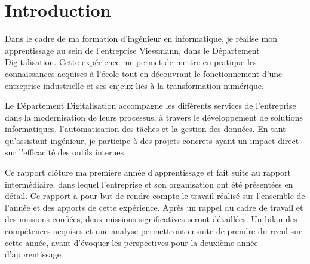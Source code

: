 \documentclass[pe1a]{tnreport} %
\begin{document}
\maketitle
{}


\cleardoublepage

\makesecondtitle

\cleardoublepage

\renewcommand{\baselinestretch}{0.5}\normalsize
\tableofcontents
\renewcommand{\baselinestretch}{1.0}\normalsize
\cleardoublepage

\setcounter{page}{1}

\chapter{Introduction}

Dans le cadre de ma formation d'ingénieur en informatique, je réalise mon apprentissage au sein de l'entreprise Viessmann, 
dans le Département Digitalisation. Cette expérience me permet de mettre en pratique les connaissances 
acquises à l'école tout en découvrant le fonctionnement d'une entreprise industrielle 
et ses enjeux liés à la transformation numérique.

Le Département Digitalisation accompagne les différents services de l'entreprise dans 
la modernisation de leurs processus, à travers le développement de solutions 
informatiques, l'automatisation des tâches et la gestion des données. En tant 
qu'assistant ingénieur, je participe à des projets concrets ayant un impact direct 
sur l'efficacité des outils internes.

Ce rapport clôture ma première année d'apprentissage et fait suite au rapport 
intermédiaire, dans lequel l'entreprise et son organisation ont été présentées en 
détail. Ce rapport a pour but de rendre compte le travail réalisé sur l'ensemble de 
l'année et des apports de cette expérience. Après un rappel du cadre de travail 
et des missions confiées, deux missions significatives seront détaillées. 
Un bilan des compétences acquises et une analyse permettront ensuite 
de prendre du recul sur cette année, avant d'évoquer les perspectives pour la 
deuxième année d'apprentissage.
\cleardoublepage

\end{document}
